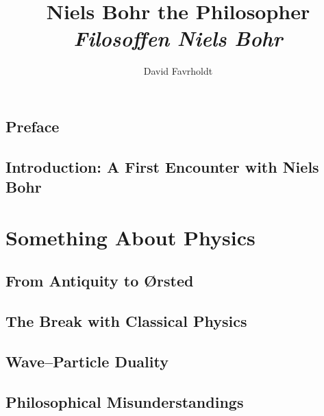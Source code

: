 \documentclass[12pt,a4paper]{book}
\title{\textbf{Niels Bohr the Philosopher}\\[6pt]
  \normalsize\textit{Filosoffen Niels Bohr}}
\author{David Favrholdt}
\date{}
\begin{document}
\frontmatter
\maketitle
\tableofcontents

\chapter{Preface}
\label{front:preface}

\chapter{Introduction: A First Encounter with Niels Bohr}
\label{front:introduction}

\mainmatter
\part{Something About Physics}
\label{part:physics}

\chapter{From Antiquity to Ørsted}
\label{chap:antiquity-oersted}

\chapter{The Break with Classical Physics}
\label{chap:break-classical}

\chapter{Wave--Particle Duality}
\label{chap:wave-particle}

\chapter{Philosophical Misunderstandings}
\label{chap:misunderstandings}
\end{document}
